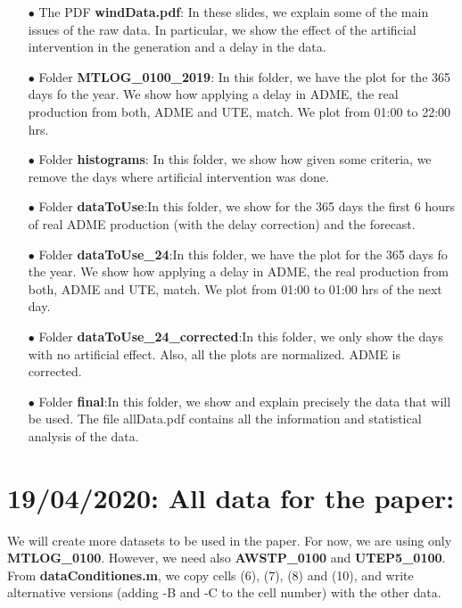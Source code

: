 \documentclass[12pt]{article}
\theoremstyle{definition}
\theoremstyle{remark}
\begin{document}
\begin{enumerate}

\item[$\bullet$] The PDF \textbf{windData.pdf}: In these slides, we explain some of the main issues of the raw data. In particular, we show the effect of the artificial intervention in the generation and a delay in the data.

\item[$\bullet$] Folder \textbf{MTLOG\_0100\_2019}: In this folder, we have the plot for the 365 days fo the year. We show how applying a delay in ADME, the real production from both, ADME and UTE, match. We plot from 01:00 to 22:00 hrs.

\item[$\bullet$] Folder \textbf{histograms}: In this folder, we show how given some criteria, we remove the days where artificial intervention was done.

\item[$\bullet$] Folder \textbf{dataToUse}:In this folder, we show for the 365 days the first 6 hours of real ADME production (with the delay correction) and the forecast.

\item[$\bullet$] Folder \textbf{dataToUse\_24}:In this folder, we have the plot for the 365 days fo the year. We show how applying a delay in ADME, the real production from both, ADME and UTE, match. We plot from 01:00 to 01:00 hrs of the next day.

\item[$\bullet$] Folder \textbf{dataToUse\_24\_corrected}:In this folder, we only show the days with no artificial effect. Also, all the plots are normalized. ADME is corrected.

\item[$\bullet$] Folder \textbf{final}:In this folder, we show and explain precisely the data that will be used. The file allData.pdf contains all the information and statistical analysis of the data.

\end{enumerate}

\section*{19/04/2020: All data for the paper:}

We will create more datasets to be used in the paper. For now, we are using only \textbf{MTLOG\_0100}. However, we need also \textbf{AWSTP\_0100} and \textbf{UTEP5\_0100}.\\
From \textbf{dataConditiones.m}, we copy cells (6), (7), (8) and (10), and write alternative versions (adding -B and -C to the cell number) with the other data.
\end{document}
